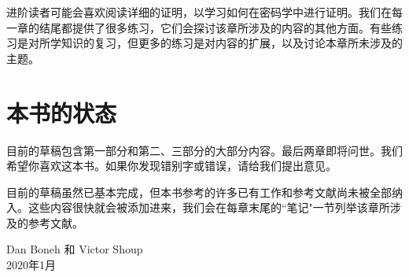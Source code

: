 进阶读者可能会喜欢阅读详细的证明，以学习如何在密码学中进行证明。我们在每一章的结尾都提供了很多练习，它们会探讨该章所涉及的内容的其他方面。有些练习是对所学知识的复习，但更多的练习是对内容的扩展，以及讨论本章所未涉及的主题。

\section*{本书的状态}

目前的草稿包含第一部分和第二、三部分的大部分内容。最后两章即将问世。我们希望你喜欢这本书。如果你发现错别字或错误，请给我们提出意见。

\begin{snote}[引用.]
目前的草稿虽然已基本完成，但本书参考的许多已有工作和参考文献尚未被全部纳入。这些内容很快就会被添加进来，我们会在每章末尾的``笔记"一节列举该章所涉及的参考文献。
\end{snote}

\vspace{50pt}

\noindent Dan Boneh 和 Victor Shoup\\
\noindent 2020年1月